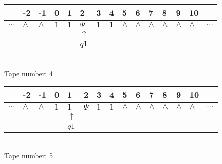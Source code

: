 \documentclass{article}
\begin{document}
\begin{table}[H]
\centering
\begin{tabular}{lllllllllllllll}
 & -2 & -1 & 0 & 1 & 2 & 3 & 4 & 5 & 6 & 7 & 8 & 9 & 10 & \\
\hline
$...$ & \multicolumn{1}{|l|}{$\wedge$} & \multicolumn{1}{|l|}{$\wedge$} & \multicolumn{1}{|l|}{$1$} & \multicolumn{1}{|l|}{$1$} & \multicolumn{1}{|l|}{$\Psi$} & \multicolumn{1}{|l|}{$1$} & \multicolumn{1}{|l|}{$1$} & \multicolumn{1}{|l|}{$\wedge$} & \multicolumn{1}{|l|}{$\wedge$} & \multicolumn{1}{|l|}{$\wedge$} & \multicolumn{1}{|l|}{$\wedge$} & \multicolumn{1}{|l|}{$\wedge$} & \multicolumn{1}{|l|}{$\wedge$} & $...$\\
\hline
&  &  &  &  & $\uparrow$ &  &  &  &  &  &  &  &  &  \\
&  &  &  &  & $ q1 $ &  &  &  &  &  &  &  &  &  \\
\end{tabular}
\\
Tape number: 4
\noindent\makebox[\linewidth]{\hdashrule{\textwidth}{1pt}{1pt}}\end{table}

\begin{table}[H]
\centering
\begin{tabular}{lllllllllllllll}
 & -2 & -1 & 0 & 1 & 2 & 3 & 4 & 5 & 6 & 7 & 8 & 9 & 10 & \\
\hline
$...$ & \multicolumn{1}{|l|}{$\wedge$} & \multicolumn{1}{|l|}{$\wedge$} & \multicolumn{1}{|l|}{$1$} & \multicolumn{1}{|l|}{$1$} & \multicolumn{1}{|l|}{$\Psi$} & \multicolumn{1}{|l|}{$1$} & \multicolumn{1}{|l|}{$1$} & \multicolumn{1}{|l|}{$\wedge$} & \multicolumn{1}{|l|}{$\wedge$} & \multicolumn{1}{|l|}{$\wedge$} & \multicolumn{1}{|l|}{$\wedge$} & \multicolumn{1}{|l|}{$\wedge$} & \multicolumn{1}{|l|}{$\wedge$} & $...$\\
\hline
&  &  &  & $\uparrow$ &  &  &  &  &  &  &  &  &  &  \\
&  &  &  & $ q1 $ &  &  &  &  &  &  &  &  &  &  \\
\end{tabular}
\\
Tape number: 5
\noindent\makebox[\linewidth]{\hdashrule{\textwidth}{1pt}{1pt}}\end{table}
\end{document}
